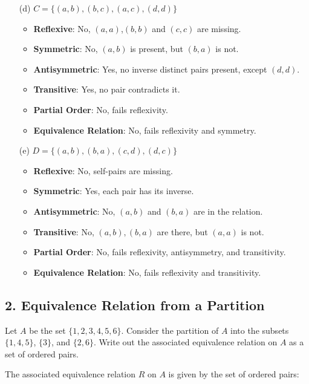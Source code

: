 \documentclass{article}
\begin{document}
\begin{enumerate}
    \item[(d)] \( C = \{(a, b), (b, c), (a, c), (d, d)\} \)
    \begin{itemize}
        \item \textbf{Reflexive}: No, $(a, a)$,$(b,b)$ and $(c, c)$ are missing.
        \item \textbf{Symmetric}: No, $(a,b)$ is present, but $(b,a)$ is not.
        \item \textbf{Antisymmetric}: Yes, no inverse distinct pairs present, except $(d,d)$.
        \item \textbf{Transitive}: Yes, no pair contradicts it.
        \item \textbf{Partial Order}: No, fails reflexivity.
        \item \textbf{Equivalence Relation}: No, fails reflexivity and symmetry.
    \end{itemize}

    \item[(e)] \( D = \{(a, b), (b, a), (c, d), (d, c)\} \)
    \begin{itemize}
        \item \textbf{Reflexive}: No, self-pairs are missing.
        \item \textbf{Symmetric}: Yes, each pair has its inverse.
        \item \textbf{Antisymmetric}: No, $(a,b)$ and $(b,a)$ are in the relation.
        \item \textbf{Transitive}: No, $(a,b),(b,a)$ are there, but $(a,a)$ is not.
        \item \textbf{Partial Order}: No, fails reflexivity, antisymmetry, and transitivity.
        \item \textbf{Equivalence Relation}: No, fails reflexivity and transitivity.
    \end{itemize}
\end{enumerate}

\subsection*{2. Equivalence Relation from a Partition}

Let $A$ be the set $\{1,2,3,4,5,6\}$. Consider the partition of $A$ into the subsets $\{1,4,5\}$, $\{3\}$, and $\{2,6\}$. Write out the associated equivalence relation on $A$ as a set of ordered pairs.

The associated equivalence relation $R$ on $A$ is given by the set of ordered pairs:
\end{document}
